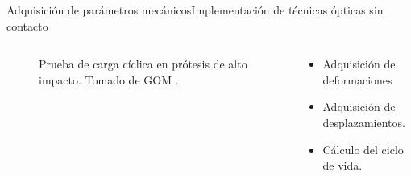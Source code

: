 \documentclass[10pt]{beamer}
\begin{document}
\begin{frame}{Adquisición de parámetros mecánicos}{Implementación de técnicas ópticas sin contacto}
\begin{columns}
\column {70 mm}
\begin{figure}
\begin{centering}
\caption{{\footnotesize Prueba de carga cíclica en prótesis de alto impacto. Tomado de GOM \cite{GOM}.}}
\end{centering}
\end{figure}

\column {50 mm}

\begin{exampleblock}{}

\begin{itemize}[label={$\checkmark$}]
\item {\footnotesize{}Adquisición de deformaciones}{\footnotesize \par}
\vspace{8 mm}
\item {\footnotesize{}Adquisición de desplazamientos.}
\vspace{8 mm}
\item {\footnotesize{Cálculo del ciclo de vida.}}
\end{itemize}
\end{exampleblock}

\end{columns}

\end{frame}
\end{document}
